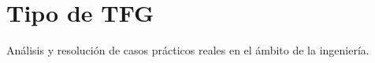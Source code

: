 \section{Tipo de TFG}
\label{sec:tipo_tfg}


Análisis y resolución de casos prácticos reales en el ámbito de la ingeniería. 